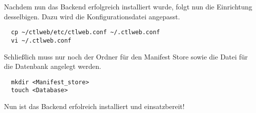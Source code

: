 Nachdem nun das Backend erfolgreich installiert wurde, folgt nun die
Einrichtung desselbigen. Dazu wird die Konfigurationsdatei angepasst.
\begin{lstlisting}
  cp ~/ctlweb/etc/ctlweb.conf ~/.ctlweb.conf
  vi ~/.ctlweb.conf
\end{lstlisting}

Schließlich muss nur noch der Ordner für den Manifest Store sowie die Datei für
die Datenbank angelegt werden.
\begin{lstlisting}
  mkdir <Manifest_store>
  touch <Database>
\end{lstlisting}

Nun ist das Backend erfolreich installiert und einsatzbereit!


